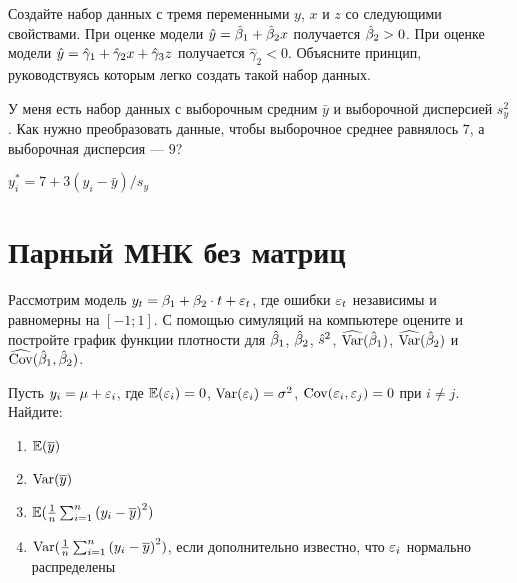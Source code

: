 \documentclass[pdftex,11pt,openany]{book}
\begin{document}
\begin{problem}
  Создайте набор данных с тремя переменными $y$, $x$ и $z$ со следующими свойствами. При оценке модели $\hat{y}=\hat{\beta}_1+\hat{\beta}_2 x$ получается $\hat{\beta}_2>0$. При оценке модели $\hat{y}=\hat{\gamma}_1+ \hat{\gamma}_2 x+\hat{\gamma}_3 z$ получается $\hat{\gamma}_2<0$. Объясните принцип, руководствуясь которым легко создать такой набор данных.
\end{problem}

\begin{solution}
\end{solution}


\begin{problem}
 У меня есть набор данных с выборочным средним $\bar{y}$ и выборочной дисперсией $s_y^2$. Как нужно преобразовать данные, чтобы выборочное среднее равнялось $7$, а выборочная дисперсия --- $9$? 
\end{problem}

\begin{solution}
 $y_i^*=7+3(y_i-\bar{y})/s_y$ 
\end{solution}



\chapter{Парный МНК без матриц}


\begin{problem}
 Рассмотрим модель $y_t=\beta_1+\beta_2 \cdot t + \varepsilon_t$, где ошибки $\varepsilon_t$ независимы и равномерны на $[-1;1]$. С помощью симуляций на компьютере оцените и постройте график функции плотности для $\hat{\beta}_1$, $\hat{\beta}_2$, $\hat{s}^2$, $\widehat{\operatorname{Var}}(\hat{\beta}_1)$, $\widehat{\operatorname{Var}}(\hat{\beta}_2)$ и $\widehat{\operatorname{Cov}}(\hat{\beta}_1,\hat{\beta}_2)$. 
\end{problem}
 
\begin{solution}
\end{solution}


\begin{problem}
 Пусть $y_i=\mu+\varepsilon_i$, где $\mathbb{E}(\varepsilon_i)=0$, $\operatorname{Var}(\varepsilon_i)=\sigma^2$, $\operatorname{Cov}(\varepsilon_i,\varepsilon_j)=0$ при $i \ne j$. Найдите:
\begin{enumerate}
\item $\mathbb{E}(\overline{y})$
\item $\operatorname{Var}(\overline{y})$
\item $\mathbb{E}(\frac{1}{n}\sum_{i=1}^n {(y_i-\overline{y})}^2)$
\item $\operatorname{Var}(\frac{1}{n}\sum_{i=1}^n {(y_i-\overline{y})}^2)$, если дополнительно известно, что $\varepsilon_i$ нормально распределены
\end{enumerate}
\end{problem}
 
\end{document}
